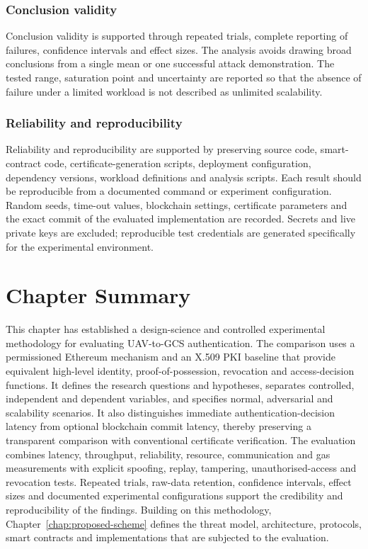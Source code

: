 \subsubsection{Conclusion validity} 
Conclusion validity is supported through repeated trials, complete reporting of failures, confidence intervals and effect sizes. The analysis avoids drawing broad conclusions from a single mean or one successful attack demonstration. The tested range, saturation point and uncertainty are reported so that the absence of failure under a limited workload is not described as unlimited scalability.

\subsubsection{Reliability and reproducibility} 
Reliability and reproducibility are supported by preserving source code, smart-contract code, certificate-generation scripts, deployment configuration, dependency versions, workload definitions and analysis scripts. Each result should be reproducible from a documented command or experiment configuration. Random seeds, time-out values, blockchain settings, certificate parameters and the exact commit of the evaluated implementation are recorded. Secrets and live private keys are excluded; reproducible test credentials are generated specifically for the experimental environment.

\section{Chapter Summary}
\label{sec:methodology-summary}
This chapter has established a design-science and controlled experimental methodology for evaluating UAV-to-GCS authentication. The comparison uses a permissioned Ethereum mechanism and an X.509 PKI baseline that provide equivalent high-level identity, proof-of-possession, revocation and access-decision functions. It defines the research questions and hypotheses, separates controlled, independent and dependent variables, and specifies normal, adversarial and scalability scenarios. It also distinguishes immediate authentication-decision latency from optional blockchain commit latency, thereby preserving a transparent comparison with conventional certificate verification.
\noindent The evaluation combines latency, throughput, reliability, resource, communication and gas measurements with explicit spoofing, replay, tampering, unauthorised-access and revocation tests. Repeated trials, raw-data retention, confidence intervals, effect sizes and documented experimental configurations support the credibility and reproducibility of the findings. Building on this methodology, Chapter~\ref{chap:proposed-scheme} defines the threat model, architecture, protocols, smart contracts and implementations that are subjected to the evaluation.
